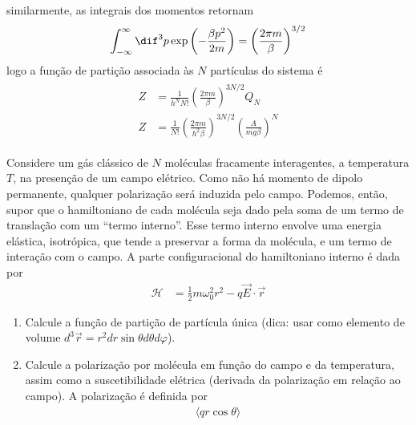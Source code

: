 \begin{prob}
\begin{sol}
\begin{dmath*}
    \end{dmath*}
    similarmente, as integrais dos momentos retornam
    \begin{dmath*}
      \int_{-\infty}^\infty\dif^3{p}\exp\left(-\frac{\beta p^2}{2m}\right)=\left(\frac{2\pi m}{\beta}\right)^{3/2}
    \end{dmath*}
    logo a função de partição associada às $N$ partículas do sistema é
    \begin{align}
      \begin{split}
        Z&=\frac{1}{h^NN!}\left(\frac{2\pi m}{\beta}\right)^{3N/2}Q_N\\
        Z&=\frac{1}{N!}\left(\frac{2\pi m}{h^2\beta}\right)^{3N/2}\left(\frac{A}{mg\beta}\right)^N
      \end{split}
    \end{align} 
  \end{sol}
\end{prob}
\begin{prob}
  Considere um gás clássico de $N$ moléculas fracamente interagentes, a temperatura $T$, na presenção de um campo elétrico. Como não há momento de dipolo permanente, qualquer polarização será induzida pelo campo. Podemos, então, supor que o hamiltoniano de cada molécula seja dado pela soma de um termo de translação com um “termo interno”. Esse termo interno envolve uma energia elástica, isotrópica, que tende a preservar a forma da molécula, e um termo de interação com o campo. A parte configuracional do hamiltoniano interno é dada por
  \begin{align}
    \mathcal{H}&=\frac{1}{2}m\omega^2_0r^2-q\vec{E}\cdot \vec{r}
  \end{align}
  \begin{enumerate}[label=\alph *)]
    \item Calcule a função de partição de partícula única (dica: usar como elemento de volume $d^3\vec{r}=r^2dr\sin\theta d\theta d\varphi$).
    \item Calcule a polarização por molécula em função do campo e da temperatura, assim como a suscetibilidade elétrica (derivada da polarização em relação ao campo). A polarização é definida por
    \begin{align}
      \langle qr\cos\theta\rangle
    \end{align}
  \end{enumerate}
\end{prob}


